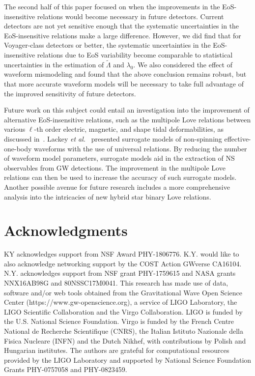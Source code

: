 \documentclass[prd,twocolumn,nofootinbib,superscriptaddress,amsmath,amssymb]{revtex4-1}
\begin{document}
The second half of this paper focused on when the improvements in the EoS-insensitive relations would become necessary in future detectors. Current detectors are not yet sensitive enough that the systematic uncertainties in the EoS-insensitive relations make a large difference. However, we did find that for Voyager-class detectors or better, the systematic uncertainties in the EoS-insensitive relations due to EoS variability become comparable to statistical uncertainties in the estimation of $\tilde{\Lambda}$ and $\lambda_{0}$. We also considered the effect of waveform mismodeling and found that the above conclusion remains robust, but that more accurate waveform models will be necessary to take full advantage of the improved sensitivity of future detectors. 

Future work on this subject could entail an investigation into the improvement of alternative EoS-insensitive relations, such as the multipole Love relations between various $\ell$-th order electric, magnetic, and shape tidal deformabilities, as discussed in~\cite{Yagi:Multipole}. Lackey \emph{et al.}~\cite{Lackey:Surrogate, Lackey:EOB} presented surrogate models of non-spinning effective-one-body waveforms with the use of universal relations. By reducing the number of waveform model parameters, surrogate models aid in the extraction of NS observables from GW detections. The improvement in the multipole Love relations can then be used to increase the accuracy of such surrogate models. Another possible avenue for future research includes a more comprehensive analysis into the intricacies of new hybrid star binary Love relations.


\section*{Acknowledgments}\label{acknowledgments}
KY acknowledges support from NSF Award PHY-1806776. 
K.Y. would like to also acknowledge networking support by the COST Action GWverse CA16104.
N.Y. acknowledges support from  NSF grant PHY-1759615 and NASA grants NNX16AB98G and 80NSSC17M0041.
%
This research has made use of data, software and/or web tools obtained from the Gravitational Wave Open Science Center (https://www.gw-openscience.org), a service of LIGO Laboratory, the LIGO Scientific Collaboration and the Virgo Collaboration. LIGO is funded by the U.S. National Science Foundation. Virgo is funded by the French Centre National de Recherche Scientifique (CNRS), the Italian Istituto Nazionale della Fisica Nucleare (INFN) and the Dutch Nikhef, with contributions by Polish and Hungarian institutes.
%
The authors are grateful for computational resources provided by the LIGO Laboratory and supported by National Science Foundation Grants PHY-0757058 and PHY-0823459.  
\end{document}
